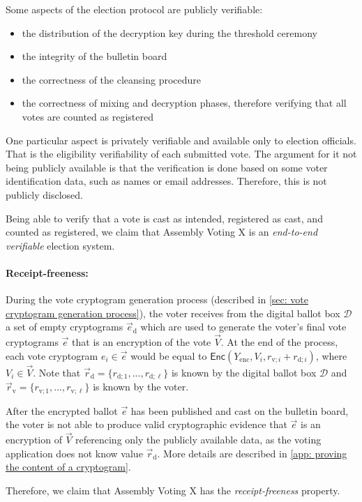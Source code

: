 Some aspects of the election protocol are publicly verifiable:
\begin{itemize}
    \item the distribution of the decryption key during the threshold ceremony
    \item the integrity of the bulletin board
    \item the correctness of the cleansing procedure
    \item the correctness of mixing and decryption phases, therefore verifying that all votes are counted as registered
\end{itemize}

One particular aspect is privately verifiable and available only to election officials. That is the eligibility verifiability of each submitted vote. The argument for it not being publicly available is that the verification is done based on some voter identification data, such as names or email addresses. Therefore, this is not publicly disclosed.

Being able to verify that a vote is cast as intended, registered as cast, and counted as registered, we claim that Assembly Voting X is an \textit{end-to-end verifiable} election system.


\paragraph{Receipt-freeness:}
During the vote cryptogram generation process (described in \cref{sec: vote cryptogram generation process}), the voter receives from the digital ballot box $\mathcal{D}$ a set of empty cryptograms $\vec{e}_\mathrm{d}$ which are used to generate the voter's final vote cryptograms $\vec{e}$ that is an encryption of the vote $\vec{V}$. At the end of the process, each vote cryptogram $e_i \in \vec{e}$ would be equal to $\mathsf{Enc} (Y_\mathrm{enc}, V_i, r_{\mathrm{v}; i} + r_{\mathrm{d}; i})$, where $V_i \in \vec{V}$. Note that $\vec{r}_\mathrm{d} = \{ r_{\mathrm{d}; 1}, ..., r_{\mathrm{d}; \ell} \}$ is known by the digital ballot box $\mathcal{D}$ and $\vec{r}_\mathrm{v} = \{ r_{\mathrm{v}; 1}, ..., r_{\mathrm{v}; \ell} \}$ is known by the voter.

After the encrypted ballot $\vec{e}$ has been published and cast on the bulletin board, the voter is not able to produce valid cryptographic evidence that $\vec{e}$ is an encryption of $\vec{V}$ referencing only the publicly available data, as the voting application does not know value $\vec{r}_\mathrm{d}$. More details are described in \cref{app: proving the content of a cryptogram}.

Therefore, we claim that Assembly Voting X has the \textit{receipt-freeness} property.
